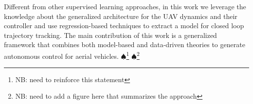 \documentclass[letterpaper, 10 pt, conference]{ieeeconf}  %
\newcommand\NB[1]{$\spadesuit$\footnote{NB: #1}}
\begin{document}
Different from other supervised learning approaches, in this work we leverage the knowledge about the generalized architecture for the UAV dynamics and their controller and use regression-based techniques to extract a model for closed loop trajectory tracking. The main contribution of this work is a generalized framework that combines both model-based and data-driven theories to generate autonomous control for aerial vehicles. 
\NB{need to reinforce this statement}
\NB{need to add a figure here that summarizes the approach}
 
 



\end{document}
